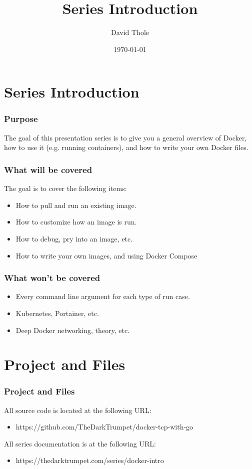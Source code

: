 \documentclass{beamer}
\begin{document}
\title{Series Introduction}
\author{David Thole}
\date{\today} 
\begin{frame}
  \titlepage
\end{frame}

\section{Series Introduction}
\begin{frame}\frametitle{Purpose}
  The goal of this presentation series is to give you a general overview of Docker, how to use it (e.g. running containers), and how to write your own Docker files.
\end{frame}
\begin{frame}\frametitle{What will be covered}
  The goal is to cover the following items:
  \begin{itemize}
  \item How to pull and run an existing image.
  \item How to customize how an image is run.
  \item How to debug, pry into an image, etc.
  \item How to write your own images, and using Docker Compose
  \end{itemize}
\end{frame}
\begin{frame}\frametitle{What won't be covered}
  \begin{itemize}
  \item Every command line argument for each type of run case.
  \item Kubernetes, Portainer, etc.
  \item Deep Docker networking, theory, etc.
  \end{itemize}
\end{frame}

\section{Project and Files}
\begin{frame}\frametitle{Project and Files}
  All source code is located at the following URL:
  \begin{itemize}
  \item https://github.com/TheDarkTrumpet/docker-tcp-with-go
  \end{itemize}
  All series documentation is at the following URL:
  \begin{itemize}
  \item https://thedarktrumpet.com/series/docker-intro
  \end{itemize}
\end{frame}
\end{document}
